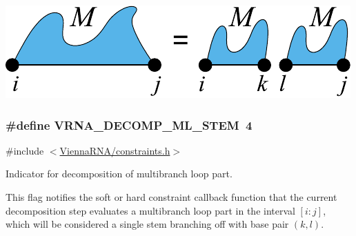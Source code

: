  
\begin{DoxyImageNoCaption}
  \mbox{\includegraphics[width=\textwidth,height=\textheight/2,keepaspectratio=true]{decomp_ml_ml_ml}}
\end{DoxyImageNoCaption}
 \hypertarget{group__constraints_ga4a23054c75d8efc785de50e3ea87602f}{}
\subsubsection[{V\+R\+N\+A\+\_\+\+D\+E\+C\+O\+M\+P\+\_\+\+M\+L\+\_\+\+S\+T\+E\+M}]{\setlength{\rightskip}{0pt plus 5cm}\#define V\+R\+N\+A\+\_\+\+D\+E\+C\+O\+M\+P\+\_\+\+M\+L\+\_\+\+S\+T\+E\+M~4}\label{group__constraints_ga4a23054c75d8efc785de50e3ea87602f}


{\ttfamily \#include $<$\hyperlink{constraints_8h}{Vienna\+R\+N\+A/constraints.\+h}$>$}



Indicator for decomposition of multibranch loop part. 

This flag notifies the soft or hard constraint callback function that the current decomposition step evaluates a multibranch loop part in the interval $[i:j]$, which will be considered a single stem branching off with base pair $(k,l)$.

